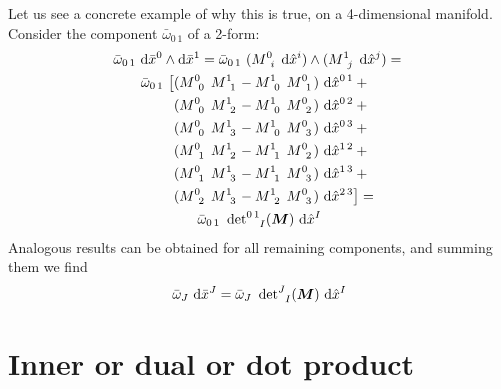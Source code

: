\documentclass[\ifafour a4paper,12pt,\else a5paper,10pt,\fi%
onecolumn,oneside,article,%
british%
]{memoir}
\theoremstyle{remark}
\theoremstyle{innote}
\newcommand*{\di}{\mathrm{d}}%
\renewcommand*{\|}[1][]{\nonscript\:#1\vert\nonscript\:\mathopen{}}
\newcommand*{\hx}{\hat{x}}
\newcommand*{\lx}{\bar{x}}
\renewcommand*{\i}{\indices}
\begin{document}
Let us see a concrete example of why this is true, on a 4-dimensional
manifold. Consider the component $\bar{\omega}_{0\,1}$ of a 2-form:
\begin{multline}
  \label{eq:coord_2form_01}
  \bar{\omega}_{0\,1}\ \di\lx^{0} \land \di\lx^{1} =
  \bar{\omega}_{0\,1}\
  (M\i{^{0}_{i}}\ \di\hx^{i}) \land (M\i{^{1}_{j}}\ \di\hx^{j})={}\\
  \bar{\omega}_{0\,1}\ 
  \begin{aligned}[t]
  \bigl[&(M\i{^{0}_{0}}\ M\i{^{1}_{1}} - M\i{^{1}_{0}}\ M\i{^{0}_{1}})\
  \di\hx^{0\,1} +{}\\
  &(M\i{^{0}_{0}}\ M\i{^{1}_{2}} - M\i{^{1}_{0}}\ M\i{^{0}_{2}})\
  \di\hx^{0\,2} +{}\\
  &(M\i{^{0}_{0}}\ M\i{^{1}_{3}} - M\i{^{1}_{0}}\ M\i{^{0}_{3}})\
  \di\hx^{0\,3} +{}\\
  &(M\i{^{0}_{1}}\ M\i{^{1}_{2}} - M\i{^{1}_{1}}\ M\i{^{0}_{2}})\
  \di\hx^{1\,2} +{}\\
  &(M\i{^{0}_{1}}\ M\i{^{1}_{3}} - M\i{^{1}_{1}}\ M\i{^{0}_{3}})\
  \di\hx^{1\,3} +{}\\
  &(M\i{^{0}_{2}}\ M\i{^{1}_{3}} - M\i{^{1}_{2}}\ M\i{^{0}_{3}})\
  \di\hx^{2\,3} \bigr] = {}
\end{aligned}\\
\bar{\omega}_{0\,1}\ \det\nolimits\i{^{0\,1}_{I}}(\bm{M})\ \di\hx^{I}
\end{multline}
Analogous results can be obtained for all remaining components, and summing
them we find
\begin{equation}
  \label{eq:components_multicov_transf_example2}
  \bar{\omega}_{J}\ \di\lx^{J} =
  \bar{\omega}_{J}\ \det\nolimits\i{^{J}_{I}}(\bm{M})\ \di\hx^{I}
\end{equation}


\section{Inner or dual or dot product}
\label{sec:inner_product}
\end{document}
